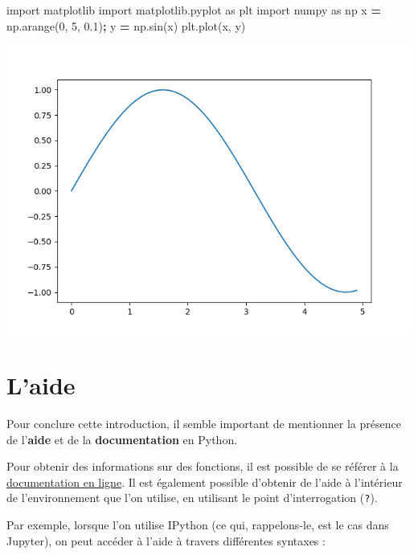 \documentclass[12pt,]{book}
\newenvironment{Shaded}{\begin{snugshade}}{\end{snugshade}}
\newcommand{\DecValTok}[1]{\textcolor[rgb]{0.00,0.00,0.81}{#1}}
\newcommand{\FloatTok}[1]{\textcolor[rgb]{0.00,0.00,0.81}{#1}}
\newcommand{\ImportTok}[1]{#1}
\newcommand{\OperatorTok}[1]{\textcolor[rgb]{0.81,0.36,0.00}{\textbf{#1}}}
\newcommand{\NormalTok}[1]{#1}
\numberwithin{equation}{section}
\numberwithin{countremarque}{section}
\begin{document}
\begin{Shaded}
\begin{Highlighting}[]
\ImportTok{import}\NormalTok{ matplotlib}
\ImportTok{import}\NormalTok{ matplotlib.pyplot  }\ImportTok{as}\NormalTok{ plt}
\ImportTok{import}\NormalTok{ numpy  }\ImportTok{as}\NormalTok{ np}
\NormalTok{x }\OperatorTok{=}\NormalTok{ np.arange(}\DecValTok{0}\NormalTok{, }\DecValTok{5}\NormalTok{, }\FloatTok{0.1}\NormalTok{)}\OperatorTok{;}
\NormalTok{y }\OperatorTok{=}\NormalTok{ np.sin(x)}
\NormalTok{plt.plot(x, y)}
\end{Highlighting}
\end{Shaded}

\begin{center}\includegraphics[width=9.03in]{figs/intro_pyplot} \end{center}

\section{L'aide}\label{laide}

Pour conclure cette introduction, il semble important de mentionner la
présence de l'\textbf{aide} et de la \textbf{documentation} en Python.

Pour obtenir des informations sur des fonctions, il est possible de se
référer à la \href{https://docs.python.org/3/}{documentation en ligne}.
Il est également possible d'obtenir de l'aide à l'intérieur de
l'environnement que l'on utilise, en utilisant le point d'interrogation
(\texttt{?}).

Par exemple, lorsque l'on utilise IPython (ce qui, rappelons-le, est le
cas dans Jupyter), on peut accéder à l'aide à travers différentes
syntaxes :
\end{document}
